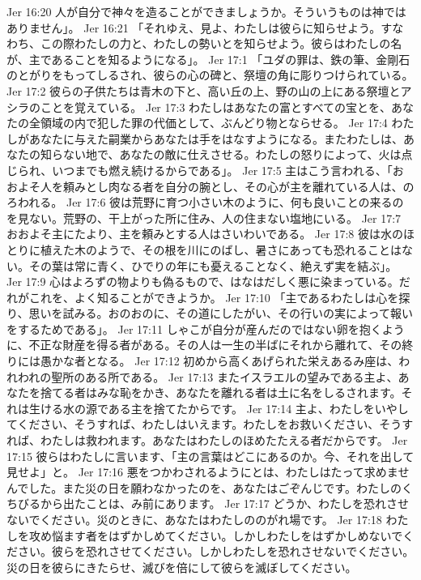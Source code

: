 Jer 16:20  人が自分で神々を造ることができましょうか。そういうものは神ではありません」。
Jer 16:21  「それゆえ、見よ、わたしは彼らに知らせよう。すなわち、この際わたしの力と、わたしの勢いとを知らせよう。彼らはわたしの名が、主であることを知るようになる」。
Jer 17:1  「ユダの罪は、鉄の筆、金剛石のとがりをもってしるされ、彼らの心の碑と、祭壇の角に彫りつけられている。
Jer 17:2  彼らの子供たちは青木の下と、高い丘の上、野の山の上にある祭壇とアシラのことを覚えている。
Jer 17:3  わたしはあなたの富とすべての宝とを、あなたの全領域の内で犯した罪の代価として、ぶんどり物とならせる。
Jer 17:4  わたしがあなたに与えた嗣業からあなたは手をはなすようになる。またわたしは、あなたの知らない地で、あなたの敵に仕えさせる。わたしの怒りによって、火は点じられ、いつまでも燃え続けるからである」。
Jer 17:5  主はこう言われる、「おおよそ人を頼みとし肉なる者を自分の腕とし、その心が主を離れている人は、のろわれる。
Jer 17:6  彼は荒野に育つ小さい木のように、何も良いことの来るのを見ない。荒野の、干上がった所に住み、人の住まない塩地にいる。
Jer 17:7  おおよそ主にたより、主を頼みとする人はさいわいである。
Jer 17:8  彼は水のほとりに植えた木のようで、その根を川にのばし、暑さにあっても恐れることはない。その葉は常に青く、ひでりの年にも憂えることなく、絶えず実を結ぶ」。
Jer 17:9  心はよろずの物よりも偽るもので、はなはだしく悪に染まっている。だれがこれを、よく知ることができようか。
Jer 17:10  「主であるわたしは心を探り、思いを試みる。おのおのに、その道にしたがい、その行いの実によって報いをするためである」。
Jer 17:11  しゃこが自分が産んだのではない卵を抱くように、不正な財産を得る者がある。その人は一生の半ばにそれから離れて、その終りには愚かな者となる。
Jer 17:12  初めから高くあげられた栄えあるみ座は、われわれの聖所のある所である。
Jer 17:13  またイスラエルの望みである主よ、あなたを捨てる者はみな恥をかき、あなたを離れる者は土に名をしるされます。それは生ける水の源である主を捨てたからです。
Jer 17:14  主よ、わたしをいやしてください、そうすれば、わたしはいえます。わたしをお救いください、そうすれば、わたしは救われます。あなたはわたしのほめたたえる者だからです。
Jer 17:15  彼らはわたしに言います、「主の言葉はどこにあるのか。今、それを出して見せよ」と。
Jer 17:16  悪をつかわされるようにとは、わたしはたって求めませんでした。また災の日を願わなかったのを、あなたはごぞんじです。わたしのくちびるから出たことは、み前にあります。
Jer 17:17  どうか、わたしを恐れさせないでください。災のときに、あなたはわたしののがれ場です。
Jer 17:18  わたしを攻め悩ます者をはずかしめてください。しかしわたしをはずかしめないでください。彼らを恐れさせてください。しかしわたしを恐れさせないでください。災の日を彼らにきたらせ、滅びを倍にして彼らを滅ぼしてください。
